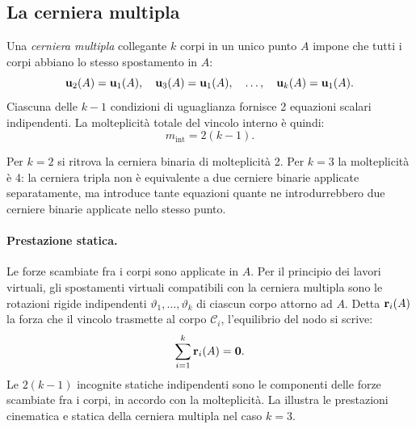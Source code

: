 \subsection{La cerniera multipla}
\label{sec:cerniera_multipla}

Una \emph{cerniera multipla} collegante $k$ corpi in un
unico punto $A$ impone che tutti i corpi abbiano lo stesso
spostamento in $A$:
\begin{equation}\label{eq:cerniera_multipla}
	\mathbf{u}_2(A) = \mathbf{u}_1(A), \quad
	\mathbf{u}_3(A) = \mathbf{u}_1(A), \quad
	\ldots, \quad
	\mathbf{u}_k(A) = \mathbf{u}_1(A).
\end{equation}
Ciascuna delle $k-1$ condizioni di uguaglianza fornisce
2 equazioni scalari indipendenti. La molteplicità totale
del vincolo interno è quindi:
\begin{equation}\label{eq:molt_cerniera_multipla}
	m_\text{int} = 2(k-1).
\end{equation}

\begin{oss}
	Per $k=2$ si ritrova la cerniera binaria di molteplicità
	2. Per $k=3$ la molteplicità è 4: la cerniera tripla
	non è equivalente a due cerniere binarie applicate
	separatamente, ma introduce tante equazioni quante ne
	introdurrebbero due cerniere binarie applicate nello
	stesso punto.
\end{oss}

\paragraph{Prestazione statica.}
Le forze scambiate fra i corpi sono applicate in $A$. Per il
principio dei lavori virtuali, gli spostamenti virtuali
compatibili con la cerniera multipla sono le rotazioni
rigide indipendenti $\vartheta_1, \ldots, \vartheta_k$ di
ciascun corpo attorno ad $A$. Detta $\mathbf{r}_i(A)$ la forza che
il vincolo trasmette al corpo $\mathcal{C}_i$, l'equilibrio
del nodo si scrive:
\begin{equation}
	\sum_{i=1}^{k} \mathbf{r}_i(A) = \mathbf{0}.
\end{equation}
Le $2(k-1)$ incognite statiche indipendenti sono le
componenti delle forze scambiate fra i corpi, in accordo
con la molteplicità. La 
illustra le prestazioni cinematica e statica della cerniera
multipla nel caso $k = 3$.






